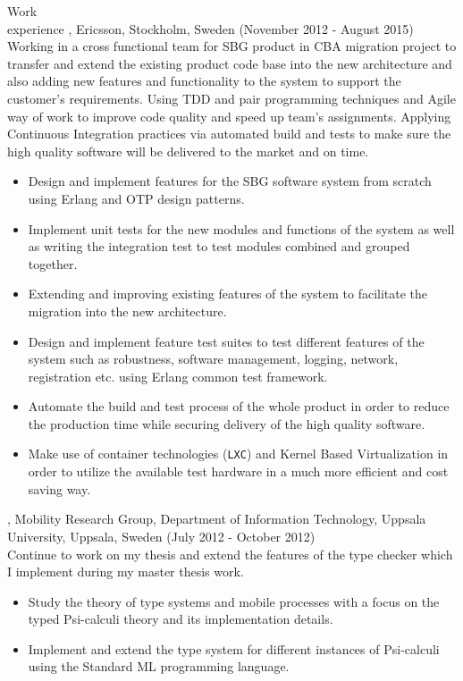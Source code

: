 \documentclass{resume}
\begin{document}
\begin{category}{Work \\experience}
, Ericsson, Stockholm, Sweden (November 2012 - August 2015)\\
Working in a cross functional team for SBG product in CBA migration project to 
transfer and extend the existing product code base into the new architecture and also 
adding new features and functionality to the system to support the customer's requirements.
Using TDD and pair programming techniques and Agile way of work to improve code quality and
speed up team's assignments. Applying Continuous Integration practices via automated build and tests to 
make sure the high quality software will be delivered to the market and on time.
\begin{itemize}
 \item Design and implement features for the SBG software system from scratch using 
       Erlang and OTP design patterns.
 \item Implement unit tests for the new modules and functions of the system as well as 
       writing the integration test to test modules combined and grouped together. 
 \item Extending and improving existing features of the system to facilitate the 
       migration into the new architecture.
 \item Design and implement feature test suites to test different features of the 
       system such as robustness, software management, logging, network, registration 
       etc. using Erlang common test framework.
 \item Automate the build and test process of the whole product in order to reduce the production time
       while securing delivery of the high quality software.
 \item Make use of container technologies (\texttt{LXC}) and Kernel Based Virtualization in order to utilize the 
       available test hardware in a much more efficient and cost saving way.
\end{itemize}

, Mobility Research Group, Department of Information Technology, 
Uppsala University, Uppsala, Sweden (July 2012 - October 2012)\\
Continue to work on my thesis and extend the features of the type checker which I 
implement during my master thesis work.
\begin{itemize}
 \item Study the theory of type systems and mobile processes with a 
       focus on the typed Psi-calculi theory and its implementation details.
 \item Implement and extend the type system for different instances of Psi-calculi 
       using the Standard ML programming language.
\end{itemize}


\end{category}
\end{document}

